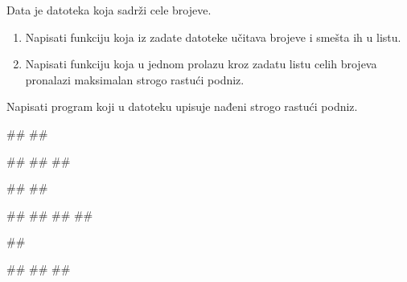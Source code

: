 
\begin{Exercise}[label=611]
Data je datoteka  koja sadrži cele brojeve.
\begin{enumerate}
 \item Napisati funkciju koja iz zadate datoteke učitava brojeve i smešta ih u listu.
 \item Napisati funkciju koja u jednom prolazu kroz zadatu listu celih brojeva 
pronalazi maksimalan strogo rastući podniz.
\end{enumerate}
Napisati program koji u datoteku  upisuje nađeni strogo rastući podniz.


\begin{minitest}
\begin{test}{1}
##
##

#\naslovIzlaz#
##
##
\end{test}
\end{minitest}
\begin{minitest}
\begin{test}{2}
##
##

#\naslovIzlaz#
##
##
##
\end{test}
\end{minitest}
\begin{minitest}
\begin{test}{3}
##

#\naslovIzlaz#
##
##
\end{test}
\end{minitest}
\end{Exercise}


